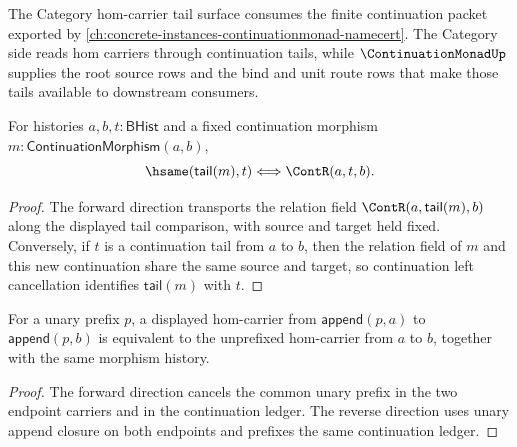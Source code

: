 


The Category hom-carrier tail surface consumes the finite continuation packet
exported by \autoref{ch:concrete-instances-continuationmonad-namecert}. The
Category side reads hom carriers through continuation tails, while
$\ContinuationMonadUp$ supplies the root source rows and the bind and unit route
rows that make those tails available to downstream consumers.

\begin{theorem}
\label{thm:continuation-morphism-tail-hsame-iff}
For histories $a,b,t:\mathsf{BHist}$ and a fixed continuation morphism
$m:\mathsf{ContinuationMorphism}(a,b)$,
$$
\hsame(\mathsf{tail}(m),t)\Longleftrightarrow \ContR(a,t,b).
$$
\end{theorem}
\begin{proof}
The forward direction transports the relation field
$\ContR(a,\mathsf{tail}(m),b)$ along the displayed tail comparison, with
source and target held fixed. Conversely, if $t$ is a continuation tail from
$a$ to $b$, then the relation field of $m$ and this new continuation share
the same source and target, so continuation left cancellation identifies
$\mathsf{tail}(m)$ with $t$.
\end{proof}

\begin{theorem}
\label{thm:category-hom-carrier-unary-prefix-iff}
For a unary prefix $p$, a displayed hom-carrier from
$\mathsf{append}(p,a)$ to $\mathsf{append}(p,b)$ is equivalent to the
unprefixed hom-carrier from $a$ to $b$, together with the same morphism
history.
\end{theorem}
\begin{proof}
The forward direction cancels the common unary prefix in the two endpoint
carriers and in the continuation ledger. The reverse direction uses unary
append closure on both endpoints and prefixes the same continuation ledger.
\end{proof}

